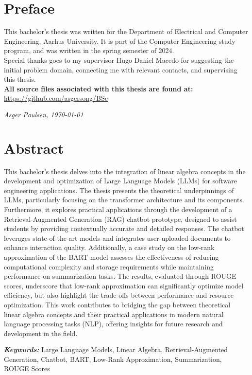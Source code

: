 \documentclass[a4paper,twoside, 12pt]{memoir} %
\begin{document}

\chapter*{Preface}
    This bachelor's thesis was written for the Department of Electrical and Computer Engineering, Aarhus University. It is part of the Computer Engineering study program, and was written in the spring semester of 2024.\\
    Special thanks goes to my supervisor Hugo Daniel Macedo for suggesting the initial problem domain, connecting me with relevant contacts, and supervising this thesis.\\
    \textbf{All source files associated with this thesis are found at:} \url{https://github.com/asgersong/BSc}
    \vspace{1.5cm}

    \begin{flushright}
        \textit{Asger Poulsen, \today}
    \end{flushright}
\chapter*{Abstract}
This bachelor's thesis delves into the integration of linear algebra concepts in the development and optimization of Large Language Models (LLMs) for software engineering applications.
The thesis presents the theoretical underpinnings of LLMs, particularly focusing on the transformer architecture and its components. Furthermore, it explores practical applications through the development of a Retrieval-Augmented Generation (RAG) chatbot prototype, designed to assist students by providing contextually accurate and detailed responses. 
The chatbot leverages state-of-the-art models and integrates user-uploaded documents to enhance interaction quality. Additionally, a case study on the low-rank approximation of the BART model assesses the effectiveness of reducing computational complexity and storage requirements while maintaining performance on summarization tasks. 
The results, evaluated through ROUGE scores, underscore that low-rank approximation can significantly optimize model efficiency, but also highlight the trade-offs between performance and resource optimization. This work contributes to bridging the gap between theoretical linear algebra concepts and their practical applications in modern natural language processing tasks (NLP), offering insights for future research and development in the field.

\emph{\textbf{Keywords:}} Large Language Models, Linear Algebra, Retrieval-Augmented Generation, Chatbot, BART, Low-Rank Approximation, Summarization, ROUGE Scores
\newpage
\end{document}
